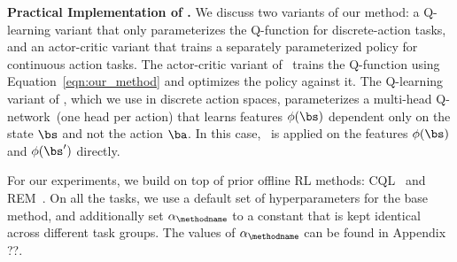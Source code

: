 \textbf{Practical Implementation of \methodname.} We discuss two variants of our method: a Q-learning variant that only parameterizes the Q-function for discrete-action tasks, and an actor-critic variant that trains a separately parameterized policy for continuous action tasks. The actor-critic variant of \methodname\ trains the Q-function using Equation~\ref{eqn:our_method} and optimizes the policy against it.
The Q-learning variant of \methodname, which we use in discrete action spaces, parameterizes a multi-head Q-network~(one head per action) that learns features $\phi(\bs)$ dependent only on the state $\bs$ and not the action $\ba$. In this case, \methodname\ is applied on the features $\phi(\bs)$ and $\phi(\bs')$ directly.

For our experiments, we build on top of prior offline RL methods: CQL~\citep{kumar2020conservative} and REM~\citep{agarwal2019optimistic}. On all the tasks, we use a default set of hyperparameters for the base method, and additionally set $\alpha_{\mathrm{\methodname}}$ to a constant that is kept identical across different task groups. The values of $\alpha_{\mathrm{\methodname}}$ can be found in Appendix ??.


\fi